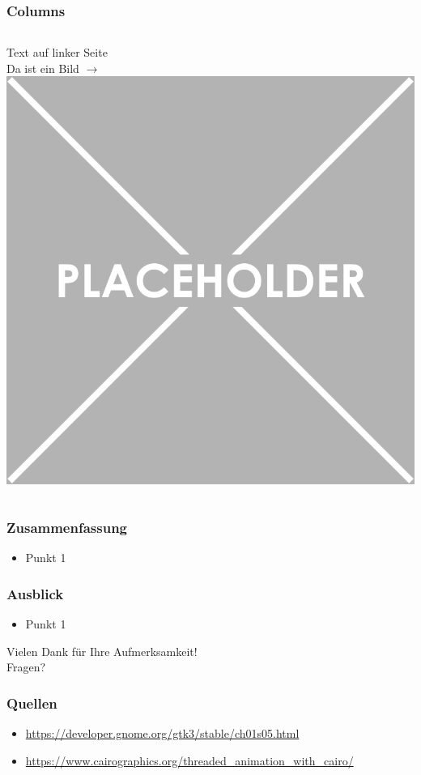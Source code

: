 \documentclass[xcolor=dvipsnames]{beamer}
\begin{document}
\begin{frame}\frametitle{Columns}
	\begin{columns}[t,onlytextwidth]
			Text auf linker Seite\\
			Da ist ein Bild $\rightarrow$
		\centering
		\includegraphics[width=1.0\textwidth,valign=t]{pictures/placeholder}
	\end{columns}
\end{frame}

\begin{frame}\frametitle{Zusammenfassung}
	\begin{itemize}
		\item Punkt 1
	\end{itemize}
\end{frame}

\begin{frame}\frametitle{Ausblick}
	\begin{itemize}
		\item Punkt 1
	\end{itemize}
\end{frame}

\begin{frame}
	\centering
	\textcolor{htwgreen}{{\LARGE Vielen Dank für Ihre Aufmerksamkeit!\\[6ex] Fragen?}}
\end{frame}

\begin{frame}\frametitle{Quellen}
	\footnotesize
	\begin{itemize}
		\item \url{https://developer.gnome.org/gtk3/stable/ch01s05.html}
		\item \url{https://www.cairographics.org/threaded_animation_with_cairo/}
	\end{itemize}
\end{frame}
\end{document}
